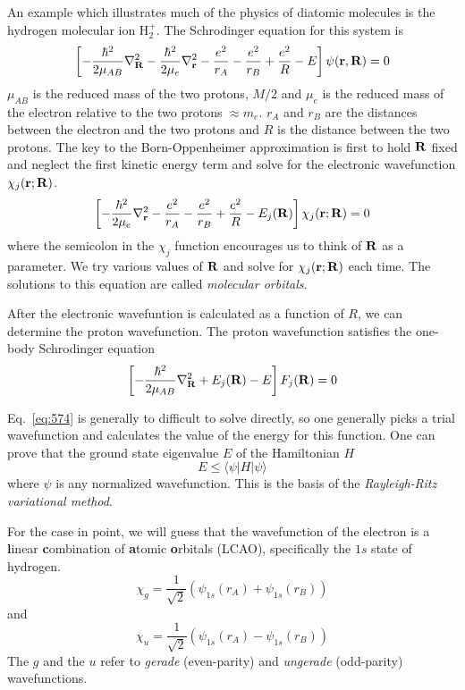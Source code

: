 An example which illustrates much of the physics of diatomic molecules
is the hydrogen molecular ion H$_2^+$.  The Schrodinger equation for
this system is
\begin{equation}
\left [ -\frac{\hbar^2}{2 \mu_{AB}} \nabla^2_{\bf R}
  -\frac{\hbar^2}{2 \mu_e} \nabla^2_{\bf r} - \frac{e^2}{r_A} -
\frac{e^2}{r_B} + \frac{e^2}{R} - E \right ] \psi({\bf r},{\bf R}) = 0  
\label{eq:573}
\end{equation}
$\mu_{AB}$ is the reduced mass of the two protons, $M/2$ and $\mu_e$
is the reduced mass of the electron relative to the two protons
$\approx m_e$.   $r_A$ and $r_B$ are the distances between the
electron and the two protons and $R$ is the distance between the two
protons.    The key to the Born-Oppenheimer approximation is first to
hold ${\bf R}$ fixed and neglect the first kinetic energy term and
solve for the electronic wavefunction $\chi_j({\bf r};{\bf R})$.
\begin{equation}
\left [ 
  -\frac{\hbar^2}{2 \mu_e} \nabla^2_{\bf r} - \frac{e^2}{r_A} -
\frac{e^2}{r_B} + \frac{e^2}{R} - E_j({\bf R}) \right ] \chi_j({\bf r};{\bf R}) = 0  
\label{eq:574}
\end{equation}
where the semicolon in the $\chi_j$ function encourages us to think of
${\bf R}$ as a parameter.  We try various values of ${\bf R}$ and
solve for $\chi_j({\bf r};{\bf R})$ each time. The solutions to this
equation are called {\em molecular orbitals}.

After the electronic wavefuntion is calculated as a function of $R$,
we can determine the proton wavefunction.  The proton wavefunction
satisfies the one-body Schrodinger equation 
\begin{equation} 
\left [
-\frac{\hbar^2}{2 \mu_{AB}} \nabla^2_{\bf R} + E_j({\bf R}) - E \right
] F_j({\bf R}) = 0 
\label{eq:575}
\end{equation}

Eq.~\ref{eq:574} is generally to difficult to solve directly, so one generally
picks a trial wavefunction and calculates the value of the energy for
this function.  One can prove that the ground state eigenvalue $E$ of the
Hamiltonian $H$
\begin{equation}
E \leq  \langle \psi | H | \psi \rangle
\label{eq:576}
\end{equation}
where $\psi$ is any normalized wavefunction.  This is the basis of the
{\em Rayleigh-Ritz variational method}.

For the case in point, we will guess that the wavefunction of the
electron is a {\bf l}inear {\bf c}ombination of {\bf a}tomic {\bf
  o}rbitals (LCAO), specifically the $1s$ state of hydrogen.
\begin{equation}
\chi_g = \frac{1}{\sqrt{2}} \left ( \psi_{1s} (r_A) + \psi_{1s}(r_B)
  \right )
\label{eq:577}
\end{equation}
and 
\begin{equation}
\chi_u = \frac{1}{\sqrt{2}} \left ( \psi_{1s} (r_A) - \psi_{1s}(r_B)
  \right )
\label{eq:578}
\end{equation}
The $g$ and the $u$ refer to {\em gerade} (even-parity) and {\em
  ungerade} (odd-parity) wavefunctions.

